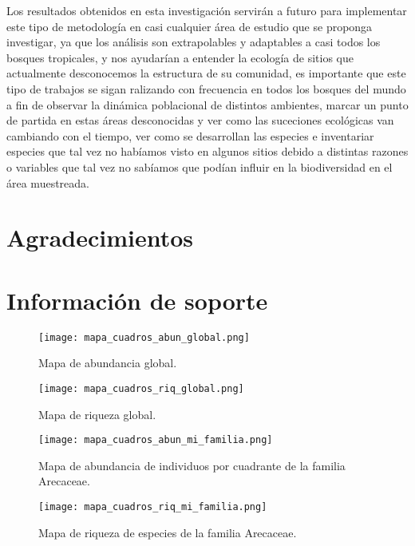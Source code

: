 \documentclass[11pt,]{article}
\newcommand{\beginsupplement}{ \setcounter{table}{0} \renewcommand{\thetable}{S\arabic{table}} \setcounter{figure}{0} \renewcommand{\thefigure}{S\arabic{figure}} }
\begin{document}
Los resultados obtenidos en esta investigación servirán a futuro para
implementar este tipo de metodología en casi cualquier área de estudio
que se proponga investigar, ya que los análisis son extrapolables y
adaptables a casi todos los bosques tropicales, y nos ayudarían a
entender la ecología de sitios que actualmente desconocemos la
estructura de su comunidad, es importante que este tipo de trabajos se
sigan ralizando con frecuencia en todos los bosques del mundo a fin de
observar la dinámica poblacional de distintos ambientes, marcar un punto
de partida en estas áreas desconocidas y ver como las suceciones
ecológicas van cambiando con el tiempo, ver como se desarrollan las
especies e inventariar especies que tal vez no habíamos visto en algunos
sitios debido a distintas razones o variables que tal vez no sabíamos
que podían influir en la biodiversidad en el área muestreada.

\section{Agradecimientos}\label{agradecimientos}

\section{Información de soporte}\label{informaciuxf3n-de-soporte}

\beginsupplement

\begin{figure}
\centering
\texttt{[image: mapa\_cuadros\_abun\_global.png]}
\caption{Mapa de abundancia global.
\label{fig:mapa_cuadros_abun_global}}
\end{figure}

\begin{figure}
\centering
\texttt{[image: mapa\_cuadros\_riq\_global.png]}
\caption{Mapa de riqueza global. \label{fig:mapa_cuadros_riq_global}}
\end{figure}

\begin{figure}
\centering
\texttt{[image: mapa\_cuadros\_abun\_mi\_familia.png]}
\caption{Mapa de abundancia de individuos por cuadrante de la familia
Arecaceae. \label{fig:mapa_cuadros_abun_mi_familia}}
\end{figure}

\begin{figure}
\centering
\texttt{[image: mapa\_cuadros\_riq\_mi\_familia.png]}
\caption{Mapa de riqueza de especies de la familia Arecaceae.
\label{fig:mapa_cuadros_riq_mi_familia}}
\end{figure}
\end{document}
